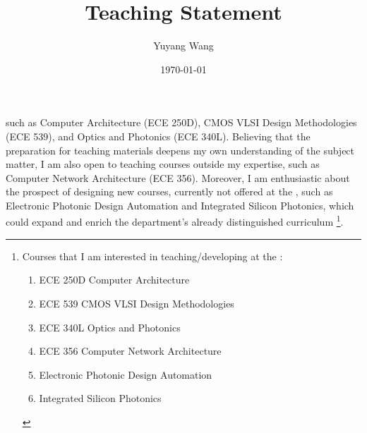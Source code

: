 



\title{Teaching Statement}

\def\courseOneName{Computer Architecture}
\def\courseOneNumber{ECE 250D}
\def\courseTwoName{CMOS VLSI Design Methodologies}
\def\courseTwoNumber{ECE 539}
\def\courseThreeName{Optics and Photonics}
\def\courseThreeNumber{ECE 340L}
\def\courseFourName{Computer Network Architecture}
\def\courseFourNumber{ECE 356}
\def\courseSixName{Electronic Photonic Design Automation}
\def\courseSevenName{Integrated Silicon Photonics}

\def\rsCustom{%
such as \courseOneName{} (\courseOneNumber{}), \courseTwoName{} (\courseTwoNumber{}), and \courseThreeName{} (\courseThreeNumber{}). Believing that the preparation for teaching materials deepens my own understanding of the subject matter, I am also open to teaching courses outside my expertise, such as \courseFourName{} (\courseFourNumber{}). Moreover, I am enthusiastic about the prospect of designing new courses, currently not offered at the \appSchool{}, such as \courseSixName{} and \courseSevenName{}, which could expand and enrich the department's already distinguished curriculum%
\footnote{%
Courses that I am interested in teaching/developing at the \appDept{}:
\begin{enumerate}
    \item \courseOneNumber{} \courseOneName{}
    \item \courseTwoNumber{} \courseTwoName{}
    \item \courseThreeNumber{} \courseThreeName{}
    \item \courseFourNumber{} \courseFourName{}
    \item \courseSixName{}
    \item \courseSevenName{}
\end{enumerate}
}.
}

\author{Yuyang Wang}
\date{\today}
\makeatletter
\fancyfoot[L]{\scshape \MakeLowercase{\@author}}
\fancyfoot[R]{{\scshape \MakeLowercase{\@title}}\quad{\fontsize{16}{20}\selectfont\sfrac{\thepage}{\pageref*{LastPage}}}\hspace{0.25in}}
\makeatother



\maketitle%


\rsCustom{}


\footnotesize


